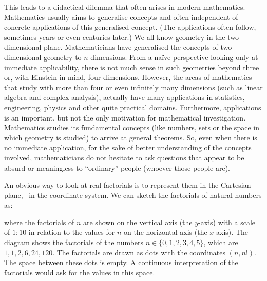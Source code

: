 \documentclass[tikz]{scrreprt}
\begin{document}
This leads to a didactical dilemma 
that often arises in modern mathematics. 
Mathematics usually aims to generalise concepts
and often independent of concrete applications
of this generalised concept.
(The applications often follow, sometimes years
 or even centuries later.)
We all know geometry in the two-dimensional plane.
Mathematicians have generalised the concepts of
two-dimensional geometry to $n$ dimensions.
From a na\"ive perspective looking 
only at immediate applicability,
there is not much sense
in such geometries beyond three or,
with Einstein in mind, four dimensions.
However, the areas of mathematics that study
 with more than four or even
infinitely many dimensions (such as linear algebra
and complex analysis), actually have many applications in
statistics, engineering, physics and other
quite practical domains.
Furthermore, applications is an important, but not
the only motivation for mathematical investigation.
Mathematics studies its fundamental concepts
(like numbers, sets or the space in which
geometry is studied) to arrive at general theorems.
So, even when there is no immediate application,
for the sake of better understanding of the concepts involved,
mathematicians do not hesitate to ask questions
that appear to be absurd or meaningless to ``ordinary'' people
(whoever those people are).

An obvious way to look at real factorials is to represent them
in the Cartesian plane, \ie\ in the coordinate system.
We can sketch the factorials of natural numbers as:

\begin{center}
\end{center}

where the factorials of $n$ are shown 
on the vertical axis (the $y$-axis)
with a scale of $1:10$ in relation to the values for $n$ 
on the horizontal axis (the $x$-axis).
The diagram shows the factorials 
of the numbers $n\in\lbrace 0, 1, 2, 3, 4, 5\rbrace$,
which are $1, 1, 2, 6, 24, 120$.
The factorials are drawn as dots with the coordinates
$(n,n!)$. The space between these dots is empty.
A continuous interpretation of the factorials would ask for the
values in this space. 
\end{document}
